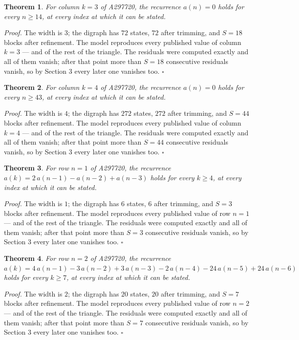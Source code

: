 \documentclass[11pt]{article}
\newtheorem{theorem}{Theorem}
\theoremstyle{definition}
\begin{document}
\begin{theorem} For column $k = 3$ of A297720, the recurrence $a(n) = 0$ holds for every $n \ge 14$, at every index at which it can be stated.\end{theorem}

{\itshape Proof.} The width is $3$; the digraph has $72$ states, $72$ after trimming, and $S = 18$ blocks after refinement. The model reproduces every published value of column $k = 3$ --- and of the rest of the triangle. The residuals were computed exactly and all of them vanish; after that point more than $S = 18$ consecutive residuals vanish, so by Section 3 every later one vanishes too. $\square$

\begin{theorem} For column $k = 4$ of A297720, the recurrence $a(n) = 0$ holds for every $n \ge 43$, at every index at which it can be stated.\end{theorem}

{\itshape Proof.} The width is $4$; the digraph has $272$ states, $272$ after trimming, and $S = 44$ blocks after refinement. The model reproduces every published value of column $k = 4$ --- and of the rest of the triangle. The residuals were computed exactly and all of them vanish; after that point more than $S = 44$ consecutive residuals vanish, so by Section 3 every later one vanishes too. $\square$

\begin{theorem} For row $n = 1$ of A297720, the recurrence $a(k) = 2\,a(n-1) - a(n-2) + a(n-3)$ holds for every $k \ge 4$, at every index at which it can be stated.\end{theorem}

{\itshape Proof.} The width is $1$; the digraph has $6$ states, $6$ after trimming, and $S = 3$ blocks after refinement. The model reproduces every published value of row $n = 1$ --- and of the rest of the triangle. The residuals were computed exactly and all of them vanish; after that point more than $S = 3$ consecutive residuals vanish, so by Section 3 every later one vanishes too. $\square$

\begin{theorem} For row $n = 2$ of A297720, the recurrence $a(k) = 4\,a(n-1) - 3\,a(n-2) + 3\,a(n-3) - 2\,a(n-4) - 24\,a(n-5) + 24\,a(n-6)$ holds for every $k \ge 7$, at every index at which it can be stated.\end{theorem}

{\itshape Proof.} The width is $2$; the digraph has $20$ states, $20$ after trimming, and $S = 7$ blocks after refinement. The model reproduces every published value of row $n = 2$ --- and of the rest of the triangle. The residuals were computed exactly and all of them vanish; after that point more than $S = 7$ consecutive residuals vanish, so by Section 3 every later one vanishes too. $\square$
\end{document}
